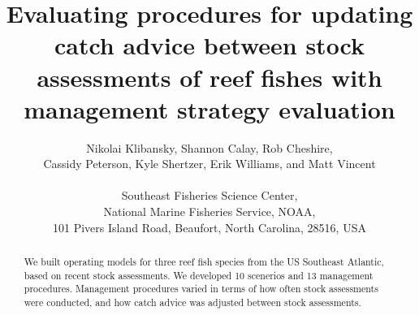 \documentclass[12pt,english]{article}
\begin{document}







\title{Evaluating procedures for updating catch advice between stock assessments of reef fishes with management strategy evaluation}
\author{Nikolai Klibansky,  Shannon Calay, Rob Cheshire,\\
Cassidy Peterson, Kyle Shertzer, Erik Williams, and Matt Vincent\\\\
Southeast Fisheries Science Center, \\
National Marine Fisheries Service, NOAA,\\
101 Pivers Island Road, Beaufort, North Carolina, 28516, USA}
\maketitle

\begin{abstract}
We built operating models for three reef fish species from the US Southeast Atlantic, based on recent stock assessments. We developed 10 scenerios and 13 management procedures. Management procedures varied in terms of how often stock assessments were conducted, and how catch advice was adjusted between stock assessments.

\end{abstract}
\end{document}
